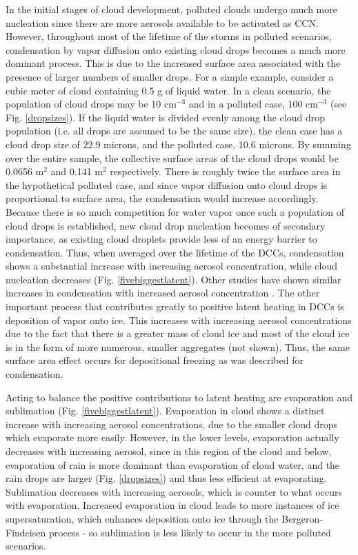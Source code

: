 In the initial stages of cloud development, polluted clouds undergo much more nucleation since there are more aerosols available to be activated as CCN.  However, throughout most of the lifetime of the storms in polluted scenarios, condensation by vapor diffusion onto existing cloud drops becomes a much more dominant process.  This is due to the increased surface area associated with the presence of larger numbers of smaller drops.  For a simple example, consider a cubic meter of cloud containing 0.5 g of liquid water.  In a clean scenario, the population of cloud drops may be 10 cm$^{-3}$ and in a polluted case, 100 cm$^{-3}$ (see Fig. \ref{dropsizes}).  If the liquid water is divided evenly among the cloud drop population (i.e. all drops are assumed to be the same size), the clean case has a cloud drop size of 22.9 microns, and the polluted case, 10.6 microns.  By summing over the entire sample, the collective surface areas of the cloud drops would be 0.0656 m$^2$ and 0.141 m$^2$ respectively.  There is roughly twice the surface area in the hypothetical polluted case, and since vapor diffusion onto cloud drops is proportional to surface area, the condensation would increase accordingly.  Because there is so much competition for water vapor once such a population of cloud drops is established, new cloud drop nucleation becomes of secondary importance, as existing cloud droplets provide less of an energy barrier to condensation.  Thus, when averaged over the lifetime of the DCCs, condensation shows a substantial increase with increasing aerosol concentration, while cloud nucleation decreases (Fig. \ref{fivebiggestlatent}).  Other studies have shown similar increases in condensation with increased aerosol concentration \citep{Khain:2008p35,leecondensation}.  The other important process that contributes greatly to positive latent heating in DCCs is deposition of vapor onto ice.  This increases with increasing aerosol concentrations due to the fact that there is a greater mass of cloud ice and most of the cloud ice is in the form of more numerous, smaller aggregates (not shown). Thus, the same surface area effect occurs for depositional freezing as was described for condensation.

Acting to balance the positive contributions to latent heating are evaporation and sublimation (Fig. \ref{fivebiggestlatent}).  Evaporation in cloud shows a distinct increase with increasing aerosol concentrations, due to the smaller cloud drops which evaporate more easily.  However, in the lower levels, evaporation actually decreases with increasing aerosol, since in this region of the cloud and below, evaporation of rain is more dominant than evaporation of cloud water, and the rain drops are larger (Fig. \ref{dropsizes}) and thus less efficient at evaporating.  Sublimation decreases with increasing aerosols, which is counter to what occurs with evaporation.  Increased evaporation in cloud leads to more instances of ice supersaturation, which enhances deposition onto ice through the Bergeron-Findeisen process - so sublimation is less likely to occur in the more polluted scenarios.

